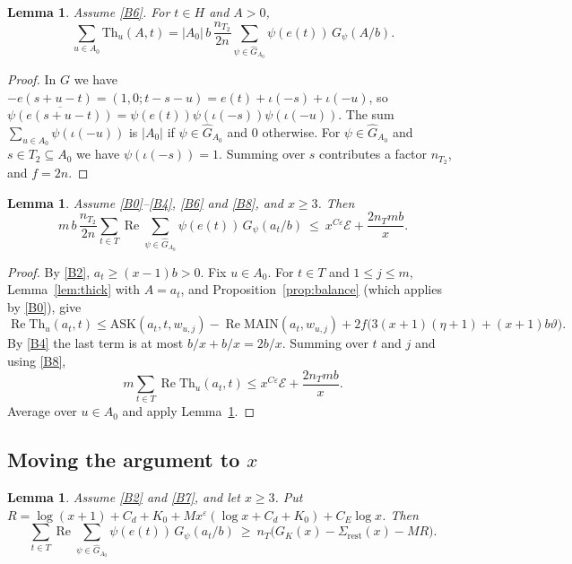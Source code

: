 \documentclass[11pt]{amsart}
\newcommand{\eps}{\varepsilon}
\newcommand{\re}{\operatorname{Re}}
\newcommand{\ASK}{\mathrm{ASK}}
\newcommand{\MAIN}{\mathrm{MAIN}}
\newcommand{\Th}{\mathrm{Th}}
\newcommand{\Gh}{\widehat{G}}
\theoremstyle{plain}
\newtheorem{lemma}[theorem]{Lemma}
\theoremstyle{definition}
\numberwithin{equation}{section}
\begin{document}
\begin{lemma}\label{lem:average}
Assume \ref{B6}. For $t\in H$ and $A>0$,
\[
\sum_{u\in A_0}\Th_u(A,t)=|A_0|\,b\,\frac{n_{T_2}}{2n}\sum_{\psi\in\Gh_{A_0}}\psi(e(t))\,G_\psi(A/b).
\]
\end{lemma}

\begin{proof}
In $G$ we have $-e(s+u-t)=(1,0;t-s-u)=e(t)+\iota(-s)+\iota(-u)$, so
$\overline{\psi(e(s+u-t))}=\psi(e(t))\psi(\iota(-s))\psi(\iota(-u))$. The sum
$\sum_{u\in A_0}\psi(\iota(-u))$ is $|A_0|$ if $\psi\in\Gh_{A_0}$ and $0$ otherwise. For
$\psi\in\Gh_{A_0}$ and $s\in T_2\subseteq A_0$ we have $\psi(\iota(-s))=1$. Summing over $s$
contributes a factor $n_{T_2}$, and $f=2n$.
\end{proof}

\begin{lemma}\label{lem:core}
Assume \ref{B0}--\ref{B4}, \ref{B6} and \ref{B8}, and $x\ge3$. Then
\[
m\,b\,\frac{n_{T_2}}{2n}\sum_{t\in T}\re\sum_{\psi\in\Gh_{A_0}}\psi(e(t))\,G_\psi(a_t/b)\ \le\ x^{C\eps}\mathcal E+\frac{2n_Tmb}{x}.
\]
\end{lemma}

\begin{proof}
By \ref{B2}, $a_t\ge(x-1)b>0$. Fix $u\in A_0$. For $t\in T$ and $1\le j\le m$,
Lemma~\ref{lem:thick} with $A=a_t$, and Proposition~\ref{prop:balance} (which applies by
\ref{B0}), give
\[
\re\Th_u(a_t,t)\le\ASK(a_t,t,w_{u,j})-\re\MAIN(a_t,w_{u,j})+2f\bigl(3(x+1)(\eta+1)+(x+1)b\vartheta\bigr).
\]
By \ref{B4} the last term is at most $b/x+b/x=2b/x$. Summing over $t$ and $j$ and using \ref{B8},
\[
m\sum_{t\in T}\re\Th_u(a_t,t)\le x^{C\eps}\mathcal E+\frac{2n_Tmb}{x}.
\]
Average over $u\in A_0$ and apply Lemma~\ref{lem:average}.
\end{proof}

\subsection{Moving the argument to \texorpdfstring{$x$}{x}}

\begin{lemma}\label{lem:move}
Assume \ref{B2} and \ref{B7}, and let $x\ge3$. Put
$R=\log(x+1)+C_d+K_0+Mx^{\eps}(\log x+C_d+K_0)+C_E\log x$. Then
\[
\sum_{t\in T}\re\sum_{\psi\in\Gh_{A_0}}\psi(e(t))\,G_\psi(a_t/b)\ \ge\ n_T\bigl(G_K(x)-\Sigma_{\mathrm{rest}}(x)-MR\bigr).
\]
\end{lemma}
\end{document}
